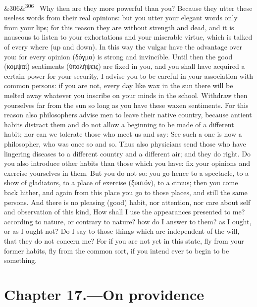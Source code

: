 \documentclass[12pt]{article}
\newcommand{\para}[1][]{\par\noindent\ifx&#1&\else\textsuperscript{\footnotesize #1}~\fi}
\begin{document}
\para[306] Why then are they more powerful than you? Because they utter these useless words from their real opinions: but you utter your elegant words only from your lips; for this reason they are without strength and dead, and it is nauseous to listen to your exhortations and your miserable virtue, which is talked of every where (up and down). In this way the vulgar have the advantage over you: for every opinion (δόγμα) is strong and invincible. Until then the good (κομψαί) sentiments (ὑπολήψεις) are fixed in you, and you shall have acquired a certain power for your security, I advise you to be careful in your association with common persons: if you are not, every day like wax in the sun there will be melted away whatever you inscribe on your minds in the school. Withdraw then yourselves far from the sun so long as you have these waxen sentiments. For this reason also philosophers advise men to leave their native country, because antient habits distract them and do not allow a beginning to be made of a different habit; nor can we tolerate those who meet us and say: See such a one is now a philosopher, who was once so and so. Thus also physicians send those who have lingering diseases to a different country and a different air; and they do right. Do you also introduce other habits than those which you have: fix your opinions and exercise yourselves in them. But you do not so: you go hence to a spectacle, to a show of gladiators, to a place of exercise (ξυστόν), to a circus; then you come back hither, and again from this place you go to those places, and still the same persons. And there is no pleasing (good) habit, nor attention, nor care about self and observation of this kind, How shall I use the appearances presented to me? according to nature, or contrary to nature? how do I answer to them? as I ought, or as I ought not? Do I say to those things which are independent of the will, that they do not concern me? For if you are not yet in this state, fly from your former habits, fly from the common sort, if you intend ever to begin to be something.

\section*{Chapter 17.---On providence}
\end{document}
